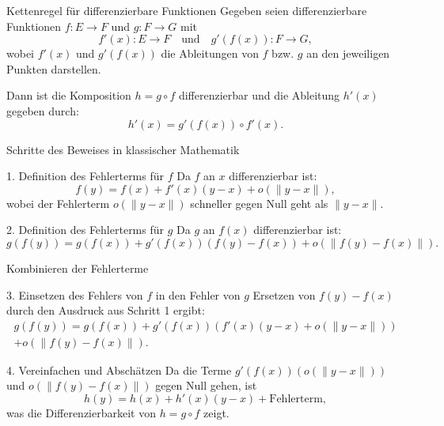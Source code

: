 \documentclass{beamer}
\begin{document}
\begin{frame}
    \begin{block}{Kettenregel für differenzierbare Funktionen}
        Gegeben seien differenzierbare Funktionen \( f : E \rightarrow F \) und \( g : F \rightarrow G \) mit
        \[
        f'(x) : E \to F \quad \text{und} \quad g'(f(x)) : F \to G,
        \]
        wobei \( f'(x) \) und \( g'(f(x)) \) die Ableitungen von \( f \) bzw. \( g \) an den jeweiligen Punkten darstellen.

        Dann ist die Komposition \( h = g \circ f \) differenzierbar und die Ableitung \( h'(x) \) gegeben durch:
        \[
        h'(x) = g'(f(x)) \circ f'(x).
        \]
    \end{block}
\end{frame}

\begin{frame}{Schritte des Beweises in klassischer Mathematik}
    \begin{block}{1. Definition des Fehlerterms für \( f \)}
        Da \( f \) an \( x \) differenzierbar ist:
        \[
        f(y) = f(x) + f'(x)(y - x) + o(\| y - x \|),
        \]
        wobei der Fehlerterm \( o(\| y - x \|) \) schneller gegen Null geht als \( \| y - x \| \).
    \end{block}

    \begin{block}{2. Definition des Fehlerterms für \( g \)}
        Da \( g \) an \( f(x) \) differenzierbar ist:
        \[
        g(f(y)) = g(f(x)) + g'(f(x))(f(y) - f(x)) + o(\| f(y) - f(x) \|).
        \]
    \end{block}
\end{frame}

\begin{frame}{Kombinieren der Fehlerterme}
    \begin{block}{3. Einsetzen des Fehlers von \( f \) in den Fehler von \( g \)}
        Ersetzen von \( f(y) - f(x) \) durch den Ausdruck aus Schritt 1 ergibt:
        \begin{align*}
        g(f(y)) = g(f(x)) + g'(f(x))\left(f'(x)(y - x)  + o(\| y - x \|)\right)  \\ 
        + o(\| f(y) - f(x) \|).
    \end{align*}
\end{block}

    \begin{block}{4. Vereinfachen und Abschätzen}
        Da die Terme \( g'(f(x))(o(\| y - x \|)) \) und \( o(\| f(y) - f(x) \|) \) gegen Null gehen, ist
        \[
        h(y) = h(x) + h'(x)(y - x) + \text{Fehlerterm},
        \]
        was die Differenzierbarkeit von \( h = g \circ f \) zeigt.
    \end{block}
\end{frame}
\end{document}
